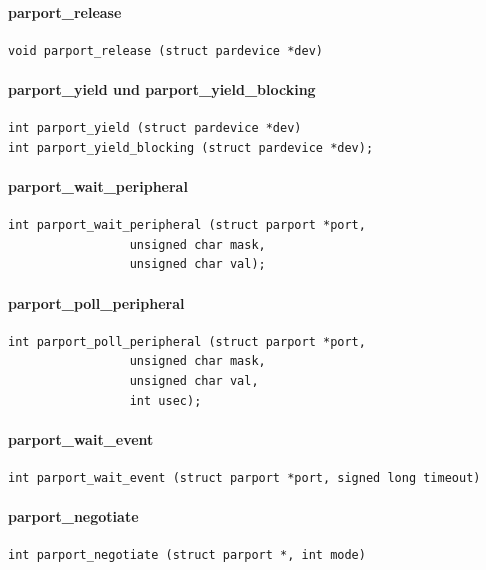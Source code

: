 \documentclass[a4paper,11pt]{article}
\begin{document}
\paragraph{parport\_release}

\begin{verbatim}
void parport_release (struct pardevice *dev)
\end{verbatim}

\paragraph{parport\_yield und parport\_yield\_blocking}

\begin{verbatim}
int parport_yield (struct pardevice *dev)
int parport_yield_blocking (struct pardevice *dev);
\end{verbatim}

\paragraph{parport\_wait\_peripheral}
\begin{verbatim}
int parport_wait_peripheral (struct parport *port,
			     unsigned char mask,
			     unsigned char val);
\end{verbatim}


\paragraph{parport\_poll\_peripheral}

\begin{verbatim}
int parport_poll_peripheral (struct parport *port,
			     unsigned char mask,
			     unsigned char val,
			     int usec);
\end{verbatim}


\paragraph{parport\_wait\_event}
\begin{verbatim}
int parport_wait_event (struct parport *port, signed long timeout)
\end{verbatim}


\paragraph{parport\_negotiate}
\begin{verbatim}
int parport_negotiate (struct parport *, int mode)
\end{verbatim}
\end{document}
